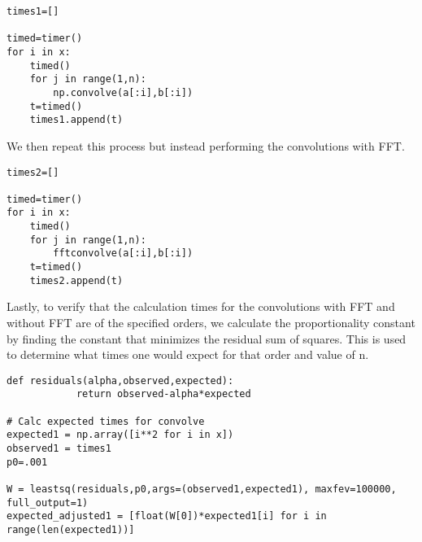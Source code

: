 \begin{lstlisting}[caption={Convolution without FFT},label=lst:example,firstnumber=65]
times1=[]

timed=timer()
for i in x:
    timed()
    for j in range(1,n):
        np.convolve(a[:i],b[:i])
    t=timed()
    times1.append(t)
\end{lstlisting}
 
 We then repeat this process but instead performing the convolutions with FFT.

\begin{lstlisting}[caption={Convolution with FFT},label=lst:example,firstnumber=65]
times2=[]

timed=timer()
for i in x:
    timed()
    for j in range(1,n):
        fftconvolve(a[:i],b[:i])
    t=timed()
    times2.append(t)
\end{lstlisting}

Lastly, to verify that the calculation times for the convolutions with FFT and without FFT are of the specified orders, we calculate the proportionality constant by finding the constant that minimizes the residual sum of squares. This is used to determine what times one would expect for that order and value of n.

\begin{lstlisting}[caption={Calculating the proportionality constants},label=lst:example,firstnumber=65]
def residuals(alpha,observed,expected):
            return observed-alpha*expected
            
# Calc expected times for convolve
expected1 = np.array([i**2 for i in x])
observed1 = times1
p0=.001

W = leastsq(residuals,p0,args=(observed1,expected1), maxfev=100000, full_output=1)
expected_adjusted1 = [float(W[0])*expected1[i] for i in range(len(expected1))]
\end{lstlisting}

